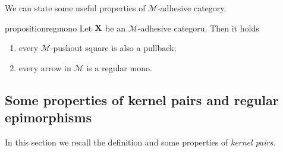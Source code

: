 \documentclass[a4paper,UKenglish,cleveref,pdftex,thm-restate,numberwithinsect]{lipics-v2021}
\def\C{\textbf {\textup{C}}}
\def\X{\textbf {\textup{X}}}
\begin{document}
\iffalse 
\begin{remark}\label{rem:deco}
We can point out an important property of strict $\mathcal{M}$-adhesive categories with pullbacks.  Consider the solid part of the cube aside, whose bottom case is an $\mathcal{M}$-pushout.
	
	\parbox{9.5cm}{	Given an arrow $d\colon X\to D$, we can present the object $X$ has a pushout: indeed, consider the following cube, in which all the three vertical squares are pullbacks.}
	\parbox{3cm}{
	\xymatrix@C=15pt@R=9pt{&V\ar[dd]|\hole_(.65){a}\ar[rr]^{v} \ar@{>.>}[dl]_{u} && Y \ar[dd]^{b} \ar@{>->}[dl]_{y} \\ Z  \ar[dd]_{c}\ar[rr]^(.7){z} & & X \ar[dd]_(.3){d}\\&A\ar[rr]|\hole^(.65){f} \ar@{>->}[dl]^{m} && B \ar@{>->}[dl]^{n} \\C \ar[rr]_{g} & & D }}

Now, notice that, since the front square is a pullback, then the dotted arrow $u\colon V\to Z$ exists. Moreover, the usual composition and decomposition property of pullbacks \cite{mac2013categories} entails that the left face of the cube so obtained is a pullback too, proving that $u$ is in $\mathcal{M}$ and that the top square is a pushout.

	Clearly if the arrow $p\colon X\to D$ is in $\mathcal{M}$, we can omit the assumptions of strictness and the existence of all pullbacks.
\end{remark}
\fi 


We can state some useful properties of $\mathcal{M}$-adhesive category.

\begin{restatable}{proposition}{regmono}\label{prop:regmono}
	Let $\X$ be an $\mathcal{M}$-adhesive categoru. Then it holds
	\begin{enumerate}
		\item every $\mathcal{M}$-pushout square is also a pullback;
		\item every arrow in $\mathcal{M}$ is a regular mono.
	\end{enumerate}
\end{restatable}


\subsection{Some properties of kernel pairs and regular epimorphisms}

In this section we recall the definition and some properties of \emph{kernel pairs}.
\end{document}
